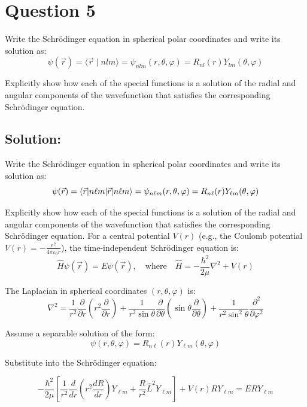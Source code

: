 \documentclass[12pt]{article}
\begin{document}
\section{Question 5}
    Write the Schrödinger equation in spherical polar coordinates and write its solution as:
    \[
        \psi(\vec{r}) = \langle \vec{r} \mid n l m \rangle = \psi_{nlm}(r, \theta, \varphi) = R_{nl}(r) Y_{lm}(\theta, \varphi)
    \]
    
    Explicitly show how each of the special functions is a solution of the radial and angular components of the wavefunction that satisfies the corresponding Schrödinger equation.

    \subsection{Solution:}
        Write the Schrödinger equation in spherical polar coordinates and write its solution as:
        \[
            \psi(\vec{r}) = \braket{\vec{r} | n\ell m} = \psi_{n\ell m}(r, \theta, \varphi) = R_{n\ell}(r) Y_{\ell m}(\theta, \varphi)
        \]
        
        Explicitly show how each of the special functions is a solution of the radial and angular components of the wavefunction that satisfies the corresponding Schrödinger equation. For a central potential \( V(r) \) (e.g., the Coulomb potential \( V(r) = -\frac{e^2}{4\pi \varepsilon_0 r} \)), the time-independent Schrödinger equation is:
        \[
            \hat{H} \psi(\vec{r}) = E \psi(\vec{r}), \quad \text{where} \quad \hat{H} = -\frac{\hbar^2}{2\mu} \nabla^2 + V(r)
        \]
        
        The Laplacian in spherical coordinates \( (r, \theta, \varphi) \) is:
        \[
            \nabla^2 = \frac{1}{r^2} \frac{\partial}{\partial r} \left( r^2 \frac{\partial}{\partial r} \right)
            + \frac{1}{r^2 \sin \theta} \frac{\partial}{\partial \theta} \left( \sin \theta \frac{\partial}{\partial \theta} \right)
            + \frac{1}{r^2 \sin^2 \theta} \frac{\partial^2}{\partial \varphi^2}
        \]
        
        Assume a separable solution of the form:
        \[
            \psi(r, \theta, \varphi) = R_{n\ell}(r) Y_{\ell m}(\theta, \varphi)
        \]
        
        Substitute into the Schrödinger equation:
        
        \[
            -\frac{\hbar^2}{2\mu} \left[
            \frac{1}{r^2} \frac{d}{dr} \left( r^2 \frac{dR}{dr} \right) Y_{\ell m}
            + \frac{R}{r^2} \hat{L}^2 Y_{\ell m}
            \right] + V(r) R Y_{\ell m} = E R Y_{\ell m}
        \]
        
\end{document}
